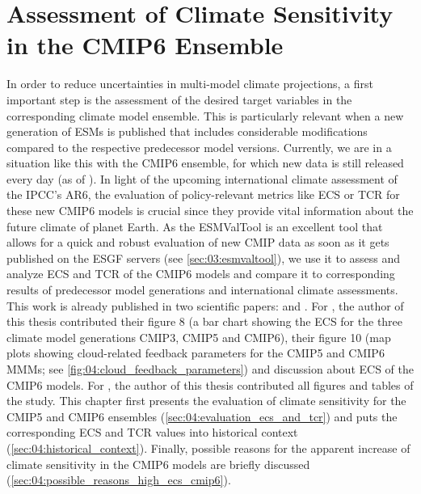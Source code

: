 


\chapter{Assessment of Climate Sensitivity in the \acs{CMIP}6 Ensemble}
\label{ch:04:papers_ecs_tcr_assessment}

In order to reduce uncertainties in multi-model climate projections, a first
important step is the assessment of the desired target variables in the
corresponding climate model ensemble. This is particularly relevant when a new
generation of \acp{ESM} is published that includes considerable modifications
compared to the respective predecessor model versions. Currently, we are in a
situation like this with the \acs{CMIP}6 ensemble, for which new data is still
released every day (as of \TheMonth{}). In light of the upcoming international
climate assessment of the \ac{IPCC}'s \acs{AR}6, the evaluation of
policy-relevant metrics like \ac{ECS} or \ac{TCR} for these new \acs{CMIP}6
models is crucial since they provide vital information about the future climate
of planet Earth. As the \ac{ESMValTool} is an excellent tool that allows for a
quick and robust evaluation of new \ac{CMIP} data as soon as it gets published
on the \ac{ESGF} servers (see \cref{sec:03:esmvaltool}), we use it to assess
and analyze \ac{ECS} and \ac{TCR} of the \acs{CMIP}6 models and compare it to
corresponding results of predecessor model generations and international
climate assessments. This work is already published in two scientific papers:
\textcite{Bock2020} and \textcite{Meehl2020}. For \textcite{Bock2020}, the
author of this thesis contributed their figure 8 (a bar chart showing the
\ac{ECS} for the three climate model generations \acs{CMIP}3, \acs{CMIP}5 and
\acs{CMIP}6), their figure 10 (map plots showing cloud-related feedback
parameters for the \acs{CMIP}5 and \acs{CMIP}6 \acp{MMM}; see
\cref{fig:04:cloud_feedback_parameters}) and discussion about \ac{ECS} of the
\acs{CMIP}6 models. For \textcite{Meehl2020}, the author of this thesis
contributed all figures and tables of the study. This chapter first presents
the evaluation of climate sensitivity for the \acs{CMIP}5 and \acs{CMIP}6
ensembles (\cref{sec:04:evaluation_ecs_and_tcr}) and puts the corresponding
\ac{ECS} and \ac{TCR} values into historical context
(\cref{sec:04:historical_context}). Finally, possible reasons for the apparent
increase of climate sensitivity in the \acs{CMIP}6 models are briefly discussed
(\cref{sec:04:possible_reasons_high_ecs_cmip6}).


